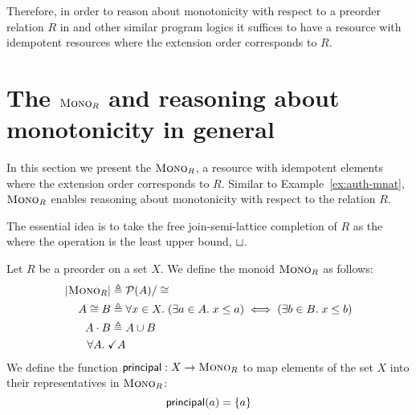 \documentclass{scrartcl}
\begin{document}
Therefore, in order to reason about monotonicity with respect to a
preorder relation $R$ in \Iris{} and other similar program logics it
suffices to have a resource with idempotent resources where the
extension order corresponds to $R$.

\section{The $\textsc{Mono}_{R}$ \PCM{} and reasoning about monotonicity in
  general}
In this section we present the \PCM{} $\textsc{Mono}_{R}$, a resource with
idempotent elements where the extension order corresponds to
$R$. Similar to Example~\ref{ex:auth-mnat}, $\textsc{Mono}_{R}$ enables
reasoning about monotonicity with respect to the relation $R$.

The essential idea is to take the free join-semi-lattice completion of
$R$ as the \PCM{} where the operation is the least upper bound,
$\sqcup$.

\begin{definition}
  Let $R$ be a preorder on a set $X$. We define the monoid $\textsc{Mono}_{R}$
  as follows:
\begin{align*}
  |\textsc{Mono}_{R}| \triangleq{}& \mathcal{P}(A)/\cong\\
  A \cong B \triangleq{}& \forall x \in X.\; (\exists a \in A.\; x \le a) \iff (\exists b \in B.\; x \le b)\\
  A \cdot B \triangleq{} & A \cup B\\
  \forall A.\; \checkmark{A}
\end{align*}
We define the function $\mathsf{principal} : X \to \textsc{Mono}_{R}$ to map elements
of the set $X$ into their representatives in $\textsc{Mono}_{R}$:
\[ \mathsf{principal}(a) = \left\{a\right\} \]
\end{definition}
\end{document}
